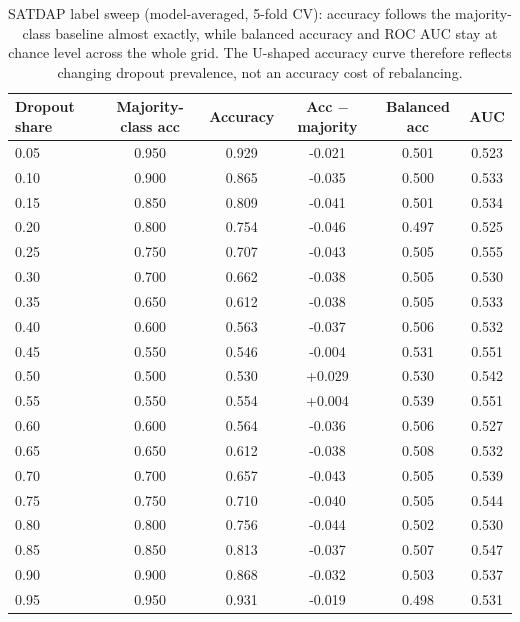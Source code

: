 \begin{table}[ht]
\centering\footnotesize
\caption{SATDAP label sweep (model-averaged, 5-fold CV): accuracy follows the
majority-class baseline almost exactly, while balanced accuracy and ROC AUC stay
at chance level across the whole grid. The U-shaped accuracy curve therefore
reflects changing dropout prevalence, not an accuracy cost of rebalancing.}
\label{tab:prevalence_satdap}
\begin{tabular}{l c c c c c}
\toprule
Dropout share & Majority-class acc & Accuracy & Acc $-$ majority & Balanced acc & AUC \\
\midrule
0.05 & 0.950 & 0.929 & -0.021 & 0.501 & 0.523 \\
0.10 & 0.900 & 0.865 & -0.035 & 0.500 & 0.533 \\
0.15 & 0.850 & 0.809 & -0.041 & 0.501 & 0.534 \\
0.20 & 0.800 & 0.754 & -0.046 & 0.497 & 0.525 \\
0.25 & 0.750 & 0.707 & -0.043 & 0.505 & 0.555 \\
0.30 & 0.700 & 0.662 & -0.038 & 0.505 & 0.530 \\
0.35 & 0.650 & 0.612 & -0.038 & 0.505 & 0.533 \\
0.40 & 0.600 & 0.563 & -0.037 & 0.506 & 0.532 \\
0.45 & 0.550 & 0.546 & -0.004 & 0.531 & 0.551 \\
0.50 & 0.500 & 0.530 & +0.029 & 0.530 & 0.542 \\
0.55 & 0.550 & 0.554 & +0.004 & 0.539 & 0.551 \\
0.60 & 0.600 & 0.564 & -0.036 & 0.506 & 0.527 \\
0.65 & 0.650 & 0.612 & -0.038 & 0.508 & 0.532 \\
0.70 & 0.700 & 0.657 & -0.043 & 0.505 & 0.539 \\
0.75 & 0.750 & 0.710 & -0.040 & 0.505 & 0.544 \\
0.80 & 0.800 & 0.756 & -0.044 & 0.502 & 0.530 \\
0.85 & 0.850 & 0.813 & -0.037 & 0.507 & 0.547 \\
0.90 & 0.900 & 0.868 & -0.032 & 0.503 & 0.537 \\
0.95 & 0.950 & 0.931 & -0.019 & 0.498 & 0.531 \\
\bottomrule
\end{tabular}
\end{table}
